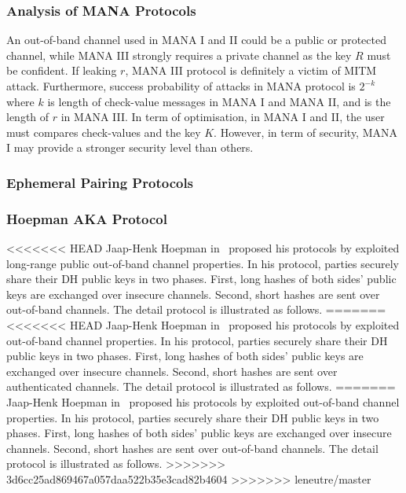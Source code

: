 \subsubsection*{Analysis of MANA Protocols}

An out-of-band channel used in MANA I and II could be a public or protected channel, while MANA III strongly requires a private channel as the key $R$ must be confident. If leaking $r$, MANA III protocol is definitely a victim of MITM attack. Furthermore, success probability of attacks in MANA protocol is $2^{-k}$ where $k$ is length of check-value messages in MANA I and MANA II, and is the length of $r$ in MANA III. In term of optimisation, in MANA I and II, the user must compares check-values and the key $K$. However, in term of security, MANA I may provide a stronger security level than others. 

\subsubsection{Ephemeral Pairing Protocols}
\subsubsection*{Hoepman AKA Protocol}

<<<<<<< HEAD
Jaap-Henk Hoepman in~\cite{Hoepman:2004aa} proposed his protocols by exploited long-range public out-of-band channel properties. In his protocol, parties securely share their DH public keys in two phases. First, long hashes of both sides' public keys are exchanged over insecure channels. Second, short hashes are sent over out-of-band channels. The detail protocol is illustrated as follows.
=======
<<<<<<< HEAD
Jaap-Henk Hoepman in~\cite{Hoepman:2004aa} proposed his protocols by exploited out-of-band channel properties. In his protocol, parties securely share their DH public keys in two phases. First, long hashes of both sides' public keys are exchanged over insecure channels. Second, short hashes are sent over authenticated channels. The detail protocol is illustrated as follows.
=======
Jaap-Henk Hoepman in~\cite{Hoepman:2004aa} proposed his protocols by exploited out-of-band channel properties. In his protocol, parties securely share their DH public keys in two phases. First, long hashes of both sides' public keys are exchanged over insecure channels. Second, short hashes are sent over out-of-band channels. The detail protocol is illustrated as follows.
>>>>>>> 3d6cc25ad869467a057daa522b35e3cad82b4604
>>>>>>> leneutre/master

